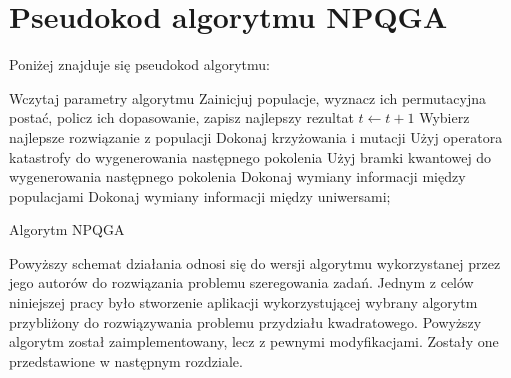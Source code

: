 \section{Pseudokod algorytmu NPQGA}
Poniżej znajduje się pseudokod algorytmu:
\newpage
\begin{framed}
\begin{algorithm}[H]
	Wczytaj parametry algorytmu\;
	Zainicjuj populacje, wyznacz ich permutacyjna postać, policz ich dopasowanie, zapisz najlepszy rezultat\;
 	{
 		$t\leftarrow t+1$\;
  		{
  			Wybierz najlepsze rozwiązanie z populacji\;
  			Dokonaj krzyżowania i mutacji\;
  			{
  				Użyj operatora katastrofy do wygenerowania następnego pokolenia\;
  			}
  			\Else
  			{
  				Użyj bramki kwantowej do wygenerowania następnego pokolenia\;
  			}
  		}
  		{
  			Dokonaj wymiany informacji między populacjami\;
  		}
  		{
  			Dokonaj wymiany informacji między uniwersami;
  		}
 	}
 	\caption{Algorytm NPQGA}
\end{algorithm}
\end{framed}
Powyższy schemat działania odnosi się do wersji algorytmu wykorzystanej przez jego autorów do rozwiązania problemu szeregowania zadań. Jednym z celów niniejszej pracy było stworzenie aplikacji wykorzystującej wybrany algorytm przybliżony do rozwiązywania problemu przydziału kwadratowego. Powyższy algorytm został zaimplementowany, lecz z pewnymi modyfikacjami. Zostały one przedstawione w następnym rozdziale.
